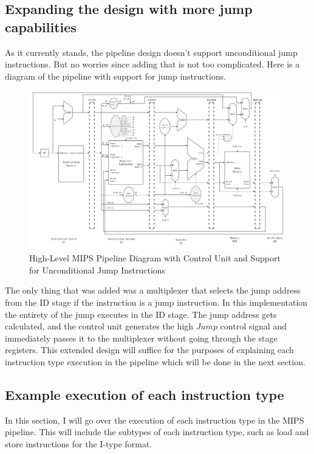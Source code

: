 \subsection{Expanding the design with more jump capabilities}\label{sec:jump_capabilities}
As it currently stands, the pipeline design doesn't support unconditional jump instructions. But no worries since adding that is not too complicated. Here is a diagram of the pipeline with support for jump instructions.

\begin{figure}[H]
    \centering
    \includegraphics[width=1\textwidth]{assets/images/mips_pipeline_jump.png}
    \caption{High-Level MIPS Pipeline Diagram with Control Unit and Support for Unconditional Jump Instructions}
    \label{fig:mips_pipeline_jump}
\end{figure}

The only thing that was added was a multiplexer that selects the jump address from the ID stage if the instruction is a jump instruction. In this implementation the entirety of the jump executes in the ID stage. The jump address gets calculated, and the control unit generates the high $Jump$ control signal and immediately passes it to the multiplexer without going through the stage registers. This extended design will suffice for the purposes of explaining each instruction type execution in the pipeline which will be done in the next section.


\subsection{Example execution of each instruction type}
In this section, I will go over the execution of each instruction type in the MIPS pipeline. This will include the subtypes of each instruction type, such as load and store instructions for the I-type format.

